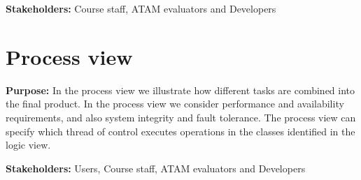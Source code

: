     \noindent\textbf{Stakeholders:} Course staff, ATAM evaluators and Developers
    

    
    
    
    \section{Process view}
    \noindent\textbf{Purpose:} In the process view we illustrate how different tasks are combined into the final product. In the process view we consider performance and availability requirements, and also system integrity and fault tolerance.
    The process view can specify which thread of control executes operations in the classes identified in the logic view. 

    \noindent\textbf{Stakeholders:} Users, Course staff, ATAM evaluators and Developers 
